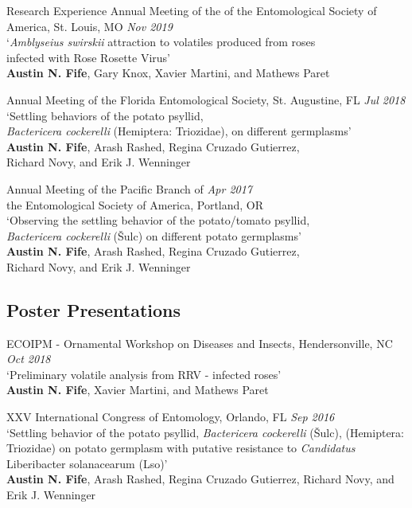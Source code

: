 \documentclass{resume} %
\begin{document}
\begin{rSection}{Research Experience}
Annual Meeting of the of the Entomological Society of America, St. Louis, MO \hfill {\em \textit{Nov 2019}}\\
`\textit{Amblyseius swirskii} attraction to volatiles produced from roses\\
infected with Rose Rosette Virus'\\
\textbf{Austin N. Fife}, Gary Knox, Xavier Martini, and Mathews Paret\\ \hfill

\newpage

Annual Meeting of the Florida Entomological Society, St. Augustine, FL \hfill {\em \textit{Jul 2018}}\\
`Settling behaviors of the potato psyllid, \\ \textit{Bactericera cockerelli} (Hemiptera: Triozidae), on different germplasms'\\
\textbf{Austin N. Fife}, Arash Rashed, Regina Cruzado Gutierrez,\\
Richard Novy, and Erik J. Wenninger\\ \hfill

Annual Meeting of the Pacific Branch of \hfill {\em \textit{Apr 2017}}\\
the Entomological Society of America, Portland, OR\\
`Observing the settling behavior of the potato/tomato psyllid,\\
\textit{Bactericera cockerelli} (Šulc) on different potato germplasms'\\
\textbf{Austin N. Fife}, Arash Rashed, Regina Cruzado Gutierrez,\\
Richard Novy, and Erik J. Wenninger\\


\subsection*{Poster Presentations}

ECOIPM - Ornamental Workshop on Diseases and Insects, Hendersonville, NC \hfill {\em \textit{Oct 2018}}\\
`Preliminary volatile analysis from RRV - infected roses'\\
\textbf{Austin N. Fife}, Xavier Martini, and Mathews Paret\\ \hfill

XXV International Congress of Entomology, Orlando, FL  \hfill {\em \textit{Sep 2016}}\\
`Settling behavior of the potato psyllid, \textit{Bactericera cockerelli} (Šulc), (Hemiptera: Triozidae) on potato germplasm with putative resistance to \textit{Candidatus} Liberibacter solanacearum (Lso)'\\
\textbf{Austin N. Fife}, Arash Rashed, Regina Cruzado Gutierrez, Richard Novy, and\\ Erik J. Wenninger \hfill


\end{rSection}
\end{document}
